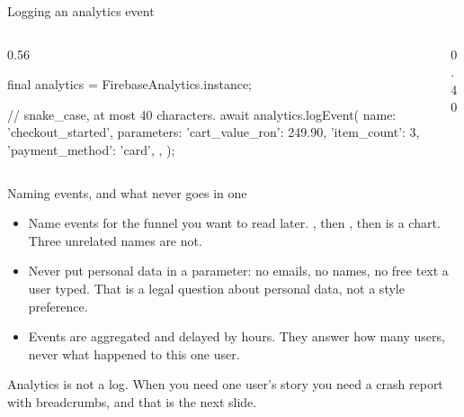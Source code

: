 \documentclass[10pt,aspectratio=169,t]{beamer}
\begin{document}
\begin{frame}[fragile,eyebrow=Observability]{Logging an analytics event}
  \begin{columns}[T]
    \begin{column}{0.56\textwidth}
\begin{dart}
final analytics = FirebaseAnalytics.instance;

// snake_case, at most 40 characters.
await analytics.logEvent(
  name: 'checkout_started',
  parameters: {
    'cart_value_ron': 249.90,
    'item_count': 3,
    'payment_method': 'card',
  },
);
\end{dart}
    \end{column}
    \begin{column}{0.40\textwidth}
      \vskip 2mm
    \end{column}
  \end{columns}
\end{frame}

\begin{frame}[eyebrow=Observability]{Naming events, and what never goes in one}
  \vskip 2mm
  \begin{itemize}
    \item Name events for the funnel you want to read later. , then , then  is a chart. Three unrelated names are not.
    \item Never put personal data in a parameter: no emails, no names, no free text a user typed. That is a legal question about personal data, not a style preference.
    \item Events are aggregated and delayed by hours. They answer how many users, never what happened to this one user.
  \end{itemize}
  \begin{takeaway}{Analytics is not a log.}
    When you need one user's story you need a crash report with breadcrumbs, and that is the next slide.
  \end{takeaway}
\end{frame}
\end{document}
